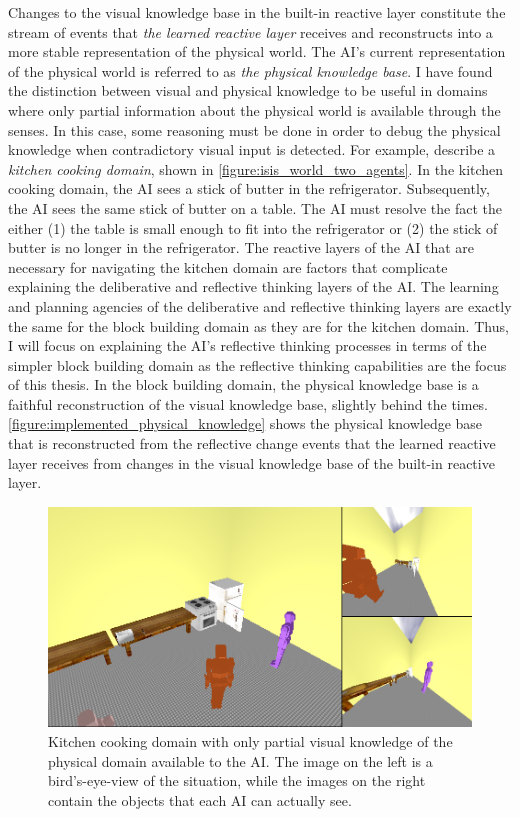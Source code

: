 Changes to the visual knowledge base in the built-in reactive layer
constitute the stream of events that \emph{the learned reactive layer}
receives and reconstructs into a more stable representation of the
physical world.  The AI's current representation of the physical world
is referred to as \emph{the physical knowledge base}.  I have found
the distinction between visual and physical knowledge to be useful in
domains where only partial information about the physical world is
available through the senses.  In this case, some reasoning must be
done in order to debug the physical knowledge when contradictory
visual input is detected.  For example, {\mbox{\cite{smith:2010}}}
describe a {\emph{kitchen cooking domain}}, shown in
{\mbox{\autoref{figure:isis_world_two_agents}}}.  In the kitchen
cooking domain, the AI sees a stick of butter in the refrigerator.
Subsequently, the AI sees the same stick of butter on a table.  The AI
must resolve the fact the either (1) the table is small enough to fit
into the refrigerator or (2) the stick of butter is no longer in the
refrigerator.  The reactive layers of the AI that are necessary for
navigating the kitchen domain are factors that complicate explaining
the deliberative and reflective thinking layers of the AI.  The
learning and planning agencies of the deliberative and reflective
thinking layers are exactly the same for the block building domain as
they are for the kitchen domain.  Thus, I will focus on explaining the
AI's reflective thinking processes in terms of the simpler block
building domain as the reflective thinking capabilities are the focus
of this thesis.  In the block building domain, the physical knowledge
base is a faithful reconstruction of the visual knowledge base,
slightly behind the times.
{\mbox{\autoref{figure:implemented_physical_knowledge}}} shows the
physical knowledge base that is reconstructed from the reflective
change events that the learned reactive layer receives from changes in
the visual knowledge base of the built-in reactive layer.
\begin{figure}
\begin{center}
\includegraphics[width=12cm]{gfx/isis_world_two_agents}
\end{center}
\caption[Kitchen cooking domain with partial visual knowledge of the
  physical domain.]{Kitchen cooking domain with only partial visual
  knowledge of the physical domain available to the AI.  The image on
  the left is a bird's-eye-view of the situation, while the images on
  the right contain the objects that each AI can actually see.}
\label{figure:isis_world_two_agents}
\end{figure}
